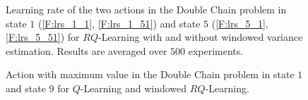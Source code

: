 \begin{figure}[t]
\begin{minipage}{\textwidth}
\end{minipage}
\caption[Learning rate adaptation in Double Chain problem]{Learning rate of the two actions in the Double Chain problem in state $1$ (\ref{F:lrs_1_1}, \ref{F:lrs_1_51}) and state $5$ (\ref{F:lrs_5_1}, \ref{F:lrs_5_51}) for $RQ$-Learning with and without windowed variance estimation. Results are averaged over $500$ experiments.}
  \label{F:double_chain_lr}
\end{figure}
\begin{figure}[t]
\begin{minipage}{\textwidth}
\centering
\end{minipage}
\caption[Policy in Double Chain problem]{Action with maximum value in the Double Chain problem in state $1$ and state $9$ for $Q$-Learning and windowed $RQ$-Learning.}
  \label{F:max_a}
\end{figure}
